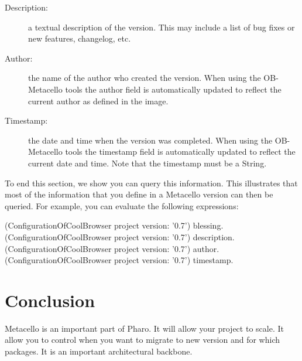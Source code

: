 \documentclass[a4paper,10pt,twoside]{book}
\begin{document}
\begin{description}

\item[ Description:] a textual description of the version. This may include a list of bug fixes or new features, changelog, etc.
\item[  Author:] the name of the author who created the version. When using the OB-Metacello tools the author field is automatically updated to reflect the current author as defined in the image.
\item[  Timestamp:] the date and time when the version was completed. When using the OB-Metacello tools the timestamp field is automatically updated to reflect the current date and time. Note that the timestamp must be a String.

\end{description}

To end this section, we show you can query this information. This illustrates that most of the information that you define in a Metacello version can then be queried. For example, you can evaluate the following expressions:

\begin{code}{}
(ConfigurationOfCoolBrowser project version: '0.7') blessing.
(ConfigurationOfCoolBrowser project version: '0.7') description.
(ConfigurationOfCoolBrowser project version: '0.7') author.
(ConfigurationOfCoolBrowser project version: '0.7') timestamp.
\end{code}


\section{Conclusion}
Metacello is an important part of Pharo. It will allow your project to scale. It allow you to control when you want to migrate to new version and for which packages. It is an important architectural backbone.
\end{document}

